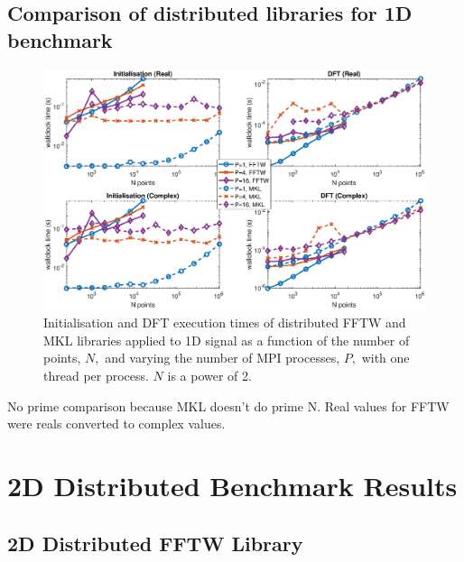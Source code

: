 \documentclass[a4paper]{article}
\begin{document}
\subsection{Comparison of distributed libraries for 1D benchmark}\label{Sec:1DDistComp}


\begin{figure}[htb]
    \centering
    \includegraphics[width=\linewidth]{../results/fftw_mkl_2_1d_mpi.eps}
  \caption{Initialisation and DFT execution times of distributed FFTW and MKL libraries applied to 1D signal as a function of the
    number of points, $N,$ and varying the number of MPI processes, $P,$ with one thread per process. $N$ is a power of 2.}
  \label{1DDistFFTWMKL2}
\end{figure}


No prime comparison because MKL doesn't do prime N. Real values for FFTW were reals converted to complex values.


\section{2D Distributed Benchmark Results}\label{Sec:2DDistr}

\subsection{2D Distributed FFTW Library}\label{Sec:2DDistFFTW}
\end{document}
